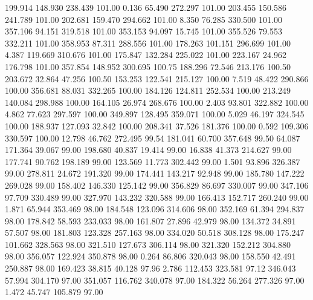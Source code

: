  199.914  148.930  238.439       101.00
   0.136   65.490  272.297       101.00
 203.455  150.586  241.789       101.00
 202.681  159.470  294.662       101.00
   8.350   76.285  330.500       101.00
 357.106   94.151  319.518       101.00
 353.153   94.097   15.745       101.00
 355.526   79.553  332.211       101.00
 358.953   87.311  288.556       101.00
 178.263  101.151  296.699       101.00
   4.387  119.669  310.676       101.00
 175.847  132.284  225.022       101.00
 223.167   24.962  176.798       101.00
 357.854  148.952  300.695       100.75
 188.296   72.546  213.176       100.50
 203.672   32.864   47.256       100.50
 153.253  122.541  215.127       100.00
   7.519   48.422  290.866       100.00
 356.681   88.031  332.265       100.00
 184.126  124.811  252.534       100.00
 213.249  140.084  298.988       100.00
 164.105   26.974  268.676       100.00
   2.403   93.801  322.882       100.00
   4.862   77.623  297.597       100.00
 349.897  128.495  359.071       100.00
   5.029   46.197  324.545       100.00
 188.937  127.093   32.842       100.00
 208.341   37.526  181.376       100.00
   0.592  109.306  330.597       100.00
  12.798   46.762  272.495        99.54
 181.041   60.700  357.648        99.50
  64.087  171.364   39.067        99.00
 198.680   40.837   19.414        99.00
  16.838   41.373  214.627        99.00
 177.741   90.762  198.189        99.00
 123.569   11.773  302.442        99.00
   1.501   93.896  326.387        99.00
 278.811   24.672  191.320        99.00
 174.441  143.217   92.948        99.00
 185.780  147.222  269.028        99.00
 158.402  146.330  125.142        99.00
 356.829   86.697  330.007        99.00
 347.106   97.709  330.489        99.00
 327.970  143.232  320.588        99.00
 166.413  152.717  260.240        99.00
   1.871   65.944  353.469        98.00
 184.548  123.096  314.606        98.00
 352.169   61.394  294.837        98.00
 178.842   58.593  233.033        98.00
 161.807   27.896   42.979        98.00
 134.372   34.891   57.507        98.00
 181.803  123.328  257.163        98.00
 334.020   50.518  308.128        98.00
 175.247  101.662  328.563        98.00
 321.510  127.673  306.114        98.00
 321.320  152.212  304.880        98.00
 356.057  122.924  350.878        98.00
   0.264   86.806  320.043        98.00
 158.550   42.491  250.887        98.00
 169.423   38.815   40.128        97.96
   2.786  112.453  323.581        97.12
 346.043   57.994  304.170        97.00
 351.057  116.762  340.078        97.00
 184.322   56.264  277.326        97.00
   1.472   45.747  105.879        97.00
